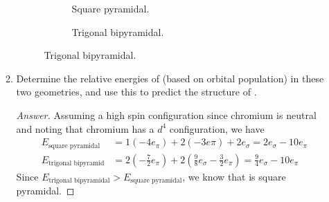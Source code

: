 \documentclass[../psets.tex]{subfiles}
\begin{document}
\begin{enumerate}[label={\Roman*)}]
\begin{enumerate}
\begin{figure}[h!]
\begin{subfigure}[b]{0.3\linewidth}
                \caption{Square pyramidal.}
            \end{subfigure}
            \begin{subfigure}[b]{0.3\linewidth}
                \centering
                \caption{Trigonal bipyramidal.}
            \end{subfigure}
        \end{figure}
        \item Determine the relative energies of  (based on orbital population) in these two geometries, and use this to predict the structure of .
        \begin{proof}[Answer]
            Assuming a high spin configuration since chromium is neutral and noting that chromium has a $d^4$ configuration, we have
            \begin{align*}
                E_\text{square pyramidal} &= 1(-4e_\pi)+2(-3e\pi)+2e_\sigma = 2e_\sigma-10e_\pi\\
                E_\text{trigonal bipyramid} &= 2\left( -\frac{7}{2}e_\pi \right)+2\left( \frac{9}{8}e_\sigma-\frac{3}{2}e_\pi \right) = \frac{9}{4}e_\sigma-10e_\pi
            \end{align*}
            Since $E_\text{trigonal bipyramidal}>E_\text{square pyramidal}$, we know that  is square pyramidal.
        \end{proof}
    \end{enumerate}
\end{enumerate}
\end{document}
